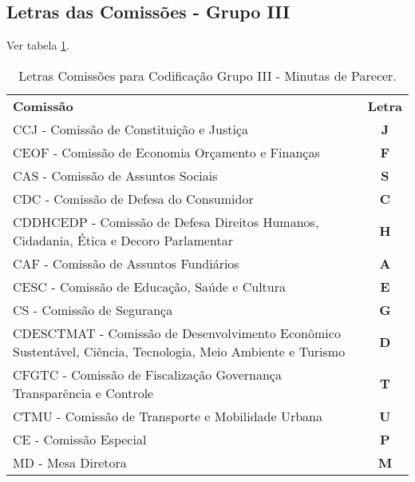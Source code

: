 \subsection{Letras das Comissões - Grupo III}

Ver tabela \ref{tab:cod:grupoiiil}.

\begin{table}[b]
	\begin{center}
		\begin{tabular}{|p{}|c|}
			\hline
			\rowcolor{lightgray!50} \multicolumn{2}{|c|}{\Large Letras Comissões para Grupo III - Minutas de Parecer \normalsize} \\ \hline \hline
			\rowcolor{lightgray}\textbf{Comissão} & \textbf{Letra} \\ \hline
			\rowcolor{corCOULD!10} CCJ - Comissão de Constituição e Justiça & \textbf{J} \\ \hline			
			\rowcolor{corCOULD!20} CEOF - Comissão de Economia Orçamento e Finanças & \textbf{F} \\ \hline			 
			\rowcolor{corCOULD!10} CAS - Comissão de Assuntos Sociais & \textbf{S} \\ \hline			
			\rowcolor{corCOULD!20} CDC - Comissão de Defesa do Consumidor & \textbf{C} \\ \hline			
			\rowcolor{corCOULD!10} CDDHCEDP - Comissão de Defesa Direitos Humanos, Cidadania, Ética e Decoro Parlamentar & \textbf{H} \\ \hline			
			\rowcolor{corCOULD!20} CAF - Comissão de Assuntos Fundiários & \textbf{A} \\ \hline			
			\rowcolor{corCOULD!10} CESC - Comissão de Educação, Saúde e Cultura & \textbf{E} \\ \hline			
			\rowcolor{corCOULD!20} CS - Comissão de Segurança & \textbf{G} \\ \hline			
			\rowcolor{corCOULD!10} CDESCTMAT - Comissão de Desenvolvimento Econômico Sustentável, Ciência, Tecnologia, Meio Ambiente e Turismo & \textbf{D} \\ \hline			
			\rowcolor{corCOULD!20} CFGTC - Comissão de Fiscalização Governança Transparência e Controle & \textbf{T} \\ \hline			
			\rowcolor{corCOULD!10} CTMU - Comissão de Transporte e Mobilidade Urbana & \textbf{U} \\ \hline			
			\rowcolor{corCOULD!10} CE - Comissão Especial & \textbf{P} \\ \hline			
			\rowcolor{corCOULD!20} MD - Mesa Diretora & \textbf{M} \\ \hline						 
		\end{tabular}    
		\caption{\label{tab:cod:grupoiiil} Letras Comissões para Codificação Grupo III - Minutas de Parecer.}
	\end{center}
\end{table}



